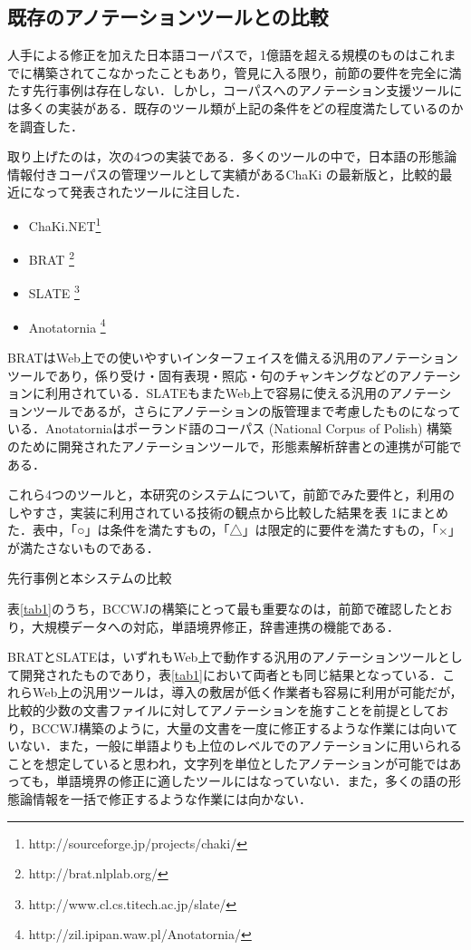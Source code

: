 \documentclass[japanese]{jnlp_1.4}
\begin{document}
\subsection{既存のアノテーションツールとの比較}

人手による修正を加えた日本語コーパスで，1億語を超える規模のものはこれまでに構築されてこなかったこともあり，管見に入る限り，前節の要件を完全に満たす先行事例は存在しない．しかし，コーパスへのアノテーション支援ツールには多くの実装がある．既存のツール類が上記の条件をどの程度満たしているのかを調査した．

取り上げたのは，次の4つの実装である．多くのツールの中で，日本語の形態論情報付きコーパスの管理ツールとして実績があるChaKi \cite{Matsumoto2005}の最新版と，比較的最近になって発表されたツールに注目した．

\begin{itemize}
\item ChaKi.NET\footnote{http://sourceforge.jp/projects/chaki/}
\item BRAT \cite{Stenetorp2012}\footnote{http://brat.nlplab.org/}
\item SLATE \cite{Kaplan2011}\footnote{http://www.cl.cs.titech.ac.jp/slate/}
\item Anotatornia \cite{Przepiorkowski2011}\footnote{http://zil.ipipan.waw.pl/Anotatornia/}
\end{itemize}

BRATはWeb上での使いやすいインターフェイスを備える汎用のアノテーションツールであり，係り受け・固有表現・照応・句のチャンキングなどのアノテーションに利用されている．SLATEもまたWeb上で容易に使える汎用のアノテーションツールであるが，さらにアノテーションの版管理まで考慮したものになっている．Anotatorniaはポーランド語のコーパス (National Corpus of Polish) 構築のために開発されたアノテーションツールで，形態素解析辞書との連携が可能である．

これら4つのツールと，本研究のシステムについて，前節でみた要件と，利用のしやすさ，実装に利用されている技術の観点から比較した結果を表 1にまとめた．表中，「○」は条件を満たすもの，「△」は限定的に要件を満たすもの，「×」が満たさないものである．

\begin{table}[b]
\caption{先行事例と本システムの比較}

\label{tab1}
\end{table}

表\ref{tab1}のうち，BCCWJの構築にとって最も重要なのは，前節で確認したとおり，大規模データへの対応，単語境界修正，辞書連携の機能である．

BRATとSLATEは，いずれもWeb上で動作する汎用のアノテーションツールとして開発されたものであり，表\ref{tab1}において両者とも同じ結果となっている．これらWeb上の汎用ツールは，導入の敷居が低く作業者も容易に利用が可能だが，比較的少数の文書ファイルに対してアノテーションを施すことを前提としており，BCCWJ構築のように，大量の文書を一度に修正するような作業には向いていない．また，一般に単語よりも上位のレベルでのアノテーションに用いられることを想定していると思われ，文字列を単位としたアノテーションが可能ではあっても，単語境界の修正に適したツールにはなっていない．また，多くの語の形態論情報を一括で修正するような作業には向かない．
\end{document}
